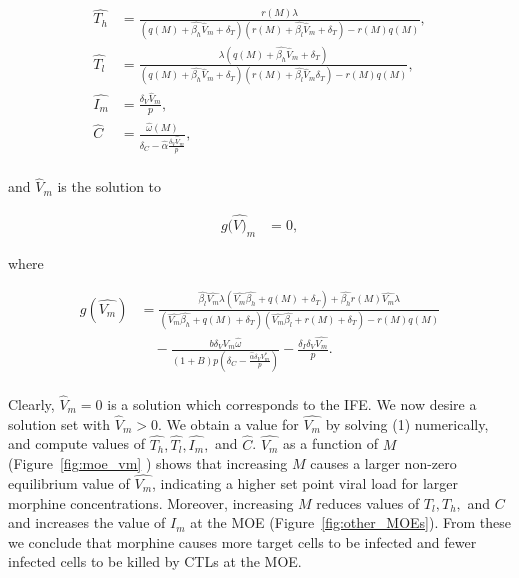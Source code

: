 \documentclass[11pt, oneside]{article}    %
\begin{document}
\begin{align*}
\hat{T_h} & = \frac{r(M) \lambda}{(q(M) + \hat{\beta_h} \hat{V}_m + \delta_T) ( r(M)+ \hat{\beta_l} \hat{V}_m + \delta_T) -r(M)q(M)}, \\
\hat{T_l} & = \frac{\lambda (q(M) + \hat{\beta_h} \hat{V}_m +\delta_T)}{(q(M) + \hat{\beta_h} \hat{V}_m + \delta_T) ( r(M)+ \hat{\beta_l} \hat{V}_m \delta_T) -r(M)q(M)}, \\
\hat{I_m} & = \frac{\delta_V \hat{V}_m}{p},\\
\hat{C} & = \frac{\hat{\omega}(M)}{\delta_C - \hat{\alpha} \frac{\delta_V \hat{V}_m}{p}}, \\
\end{align*}

and $\hat{V}_m$ is the solution to 

\begin{align}
g(\hat{V)}_m & = 0,
\end{align}

where

\begin{align*}
g(\hat{V_m}) & = \frac{\hat{\beta_l} \hat{V_m} \lambda \left(\hat{V_m} \hat{\beta_h} + q(M) + \delta_T \right) + \hat{\beta_h} r(M) \hat{V_m} \lambda   }   {\left(\hat{V_m} \hat{\beta_h} + q(M) + \delta_T \right)  
  \left(\hat{V_m} \hat{\beta_l} + r(M)+\delta_T \right) - r(M)q(M)} \\
 &	\quad  -  \frac{b \delta_V \hat{V_m} \hat{\omega}}{ \left(1+B\right) p \left( \delta_C - \frac{\hat{\alpha} \delta_V V_m^*}{p}  \right)  }      
- \frac{\delta_I \delta_V \hat{V_m}}{p} . \\
\end{align*}

Clearly, $\hat{V}_m = 0$ is a solution which corresponds to the IFE. We now desire a solution set with $\hat{V}_m > 0$. We obtain a value for $\hat{V_m}$ by solving (1) numerically, and compute values of $\hat{T_h},\hat{T_l},\hat{I_m},$ and $\hat{C}$.  $\hat{V_m}$ as a function of $M$ (Figure~\ref{fig:moe_vm} ) shows that increasing $M$ causes a larger non-zero equilibrium value of $\hat{V_m}$, indicating a higher set point viral load for larger morphine concentrations. Moreover, increasing $M$ reduces values of $T_l, T_h,$ and $C$ and increases the value of $I_m$ at the MOE (Figure~\ref{fig:other_MOEs}). From these we conclude that morphine causes more target cells to be infected and fewer infected cells to be killed by CTLs at the MOE.
\end{document}
